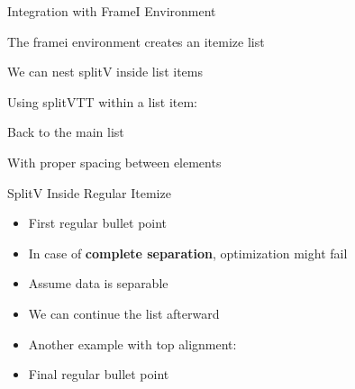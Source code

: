 \documentclass[11pt,compress,t,notes=noshow, xcolor=table]{beamer}
\begin{document}

\begin{framei}[fs=footnotesize,sep=M]{Integration with FrameI Environment}
  \item The framei environment creates an itemize list
  \item We can nest splitV inside list items
  
  \item Using splitVTT within a list item:
  
  \item Back to the main list
  \item With proper spacing between elements
\end{framei}


\begin{frame}{SplitV Inside Regular Itemize}
  \begin{itemize}
    \item First regular bullet point
    
    \item In case of \textbf{complete separation}, optimization might fail
    
    \item Assume data is separable
    \item We can continue the list afterward
    
    \item Another example with top alignment:
    
    \item Final regular bullet point
  \end{itemize}
\end{frame}
\end{document}
